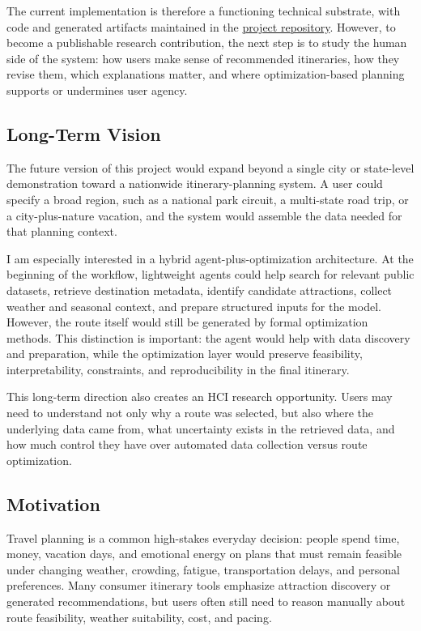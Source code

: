 \documentclass[11pt,a4paper]{article}
\begin{document}
\noindent The current implementation is therefore a functioning technical substrate, with code and generated artifacts maintained in the \href{https://github.com/Ztang-Yit-Xiaang/weather-aware-travel-itinerary-optimization}{project repository}. However, to become a publishable research contribution, the next step is to study the human side of the system: how users make sense of recommended itineraries, how they revise them, which explanations matter, and where optimization-based planning supports or undermines user agency.

\subsection*{Long-Term Vision}

\noindent The future version of this project would expand beyond a single city or state-level demonstration toward a nationwide itinerary-planning system. A user could specify a broad region, such as a national park circuit, a multi-state road trip, or a city-plus-nature vacation, and the system would assemble the data needed for that planning context.

\noindent I am especially interested in a hybrid agent-plus-optimization architecture. At the beginning of the workflow, lightweight agents could help search for relevant public datasets, retrieve destination metadata, identify candidate attractions, collect weather and seasonal context, and prepare structured inputs for the model. However, the route itself would still be generated by formal optimization methods. This distinction is important: the agent would help with data discovery and preparation, while the optimization layer would preserve feasibility, interpretability, constraints, and reproducibility in the final itinerary.

\noindent This long-term direction also creates an HCI research opportunity. Users may need to understand not only why a route was selected, but also where the underlying data came from, what uncertainty exists in the retrieved data, and how much control they have over automated data collection versus route optimization.

\subsection*{Motivation}

\noindent Travel planning is a common high-stakes everyday decision: people spend time, money, vacation days, and emotional energy on plans that must remain feasible under changing weather, crowding, fatigue, transportation delays, and personal preferences. Many consumer itinerary tools emphasize attraction discovery or generated recommendations, but users often still need to reason manually about route feasibility, weather suitability, cost, and pacing.
\end{document}
